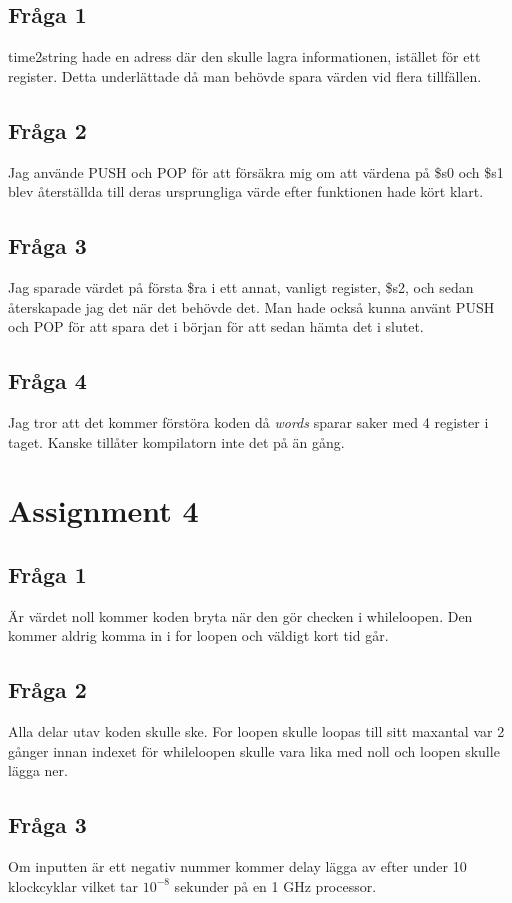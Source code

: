 \documentclass[a4paper,11p]{article}
\begin{document}
\subsection{Fråga 1}
time2string hade en adress där den skulle lagra informationen, istället för ett register. Detta underlättade då man behövde spara värden vid flera tillfällen. 
\subsection{Fråga 2}
Jag använde PUSH och POP för att försäkra mig om att värdena på \$s0 och \$s1 blev återställda till deras ursprungliga värde efter funktionen hade kört klart.
\subsection{Fråga 3}
Jag sparade värdet på första \$ra i ett annat, vanligt register, \$s2, och sedan återskapade jag det när det behövde det. Man hade också kunna använt PUSH och POP för att spara det i början för att sedan hämta det i slutet.
\subsection{Fråga 4}
Jag tror att det kommer förstöra koden då \emph{words} sparar saker med 4 register i taget. Kanske tillåter kompilatorn inte det på än gång. 
\section{Assignment 4}
\subsection{Fråga 1}
Är värdet noll kommer koden bryta när den gör checken i whileloopen. Den kommer aldrig komma in i for loopen och väldigt kort tid går.
\subsection{Fråga 2}
Alla delar utav koden skulle ske. For loopen skulle loopas till sitt maxantal var 2 gånger innan indexet för whileloopen skulle vara lika med noll och loopen skulle lägga ner.
\subsection{Fråga 3}
Om inputten är ett negativ nummer kommer delay lägga av efter under 10 klockcyklar vilket tar $10^{-8}$ sekunder på en 1 GHz processor.
\end{document}
